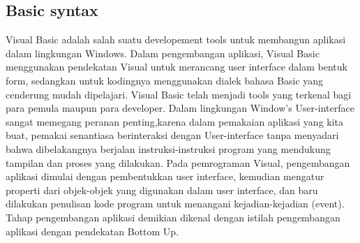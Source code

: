 \subsection {Basic syntax}
Visual Basic adalah salah suatu developement tools untuk membangun aplikasi dalam lingkungan Windows. Dalam pengembangan aplikasi, Visual Basic menggunakan pendekatan Visual untuk merancang user interface dalam bentuk form, sedangkan untuk kodingnya menggunakan dialek bahasa Basic yang cenderung mudah dipelajari. Visual Basic telah menjadi tools yang terkenal bagi para pemula maupun para developer. Dalam lingkungan Window’s User-interface sangat memegang peranan penting,karena dalam pemakaian aplikasi yang kita buat, pemakai senantiasa berinteraksi dengan User-interface tanpa menyadari bahwa dibelakangnya berjalan instruksi-instruksi program yang mendukung tampilan dan proses yang dilakukan.
Pada pemrograman Visual, pengembangan aplikasi dimulai dengan pembentukkan user interface, kemudian mengatur properti dari objek-objek yang digunakan dalam user interface, dan baru dilakukan penulisan kode program untuk menangani kejadian-kejadian (event). Tahap pengembangan aplikasi demikian dikenal dengan istilah pengembangan aplikasi dengan pendekatan Bottom Up.
